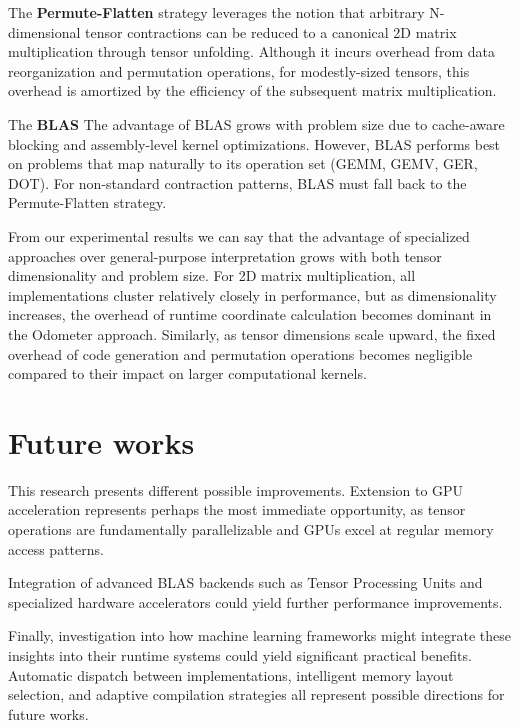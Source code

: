 \documentclass[binding=0.6cm]{sapthesis}
\begin{document}
The \textbf{Permute-Flatten} strategy leverages the notion that arbitrary N-dimensional tensor contractions can be reduced to a canonical 2D matrix multiplication through tensor unfolding. Although it incurs overhead from data reorganization and permutation operations, for modestly-sized tensors, this overhead is amortized by the efficiency of the subsequent matrix multiplication.

The \textbf{BLAS} The advantage of BLAS grows with problem size due to cache-aware blocking and assembly-level kernel optimizations. However, BLAS performs best on problems that map naturally to its operation set (GEMM, GEMV, GER, DOT). For non-standard contraction patterns, BLAS must fall back to the Permute-Flatten strategy.

From our experimental results we can say that the advantage of specialized approaches over general-purpose interpretation grows with both tensor dimensionality and problem size. For 2D matrix multiplication, all implementations cluster relatively closely in performance, but as dimensionality increases, the overhead of runtime coordinate calculation becomes dominant in the Odometer approach. Similarly, as tensor dimensions scale upward, the fixed overhead of code generation and permutation operations becomes negligible compared to their impact on larger computational kernels.

\section{Future works}

This research presents different possible improvements. Extension to GPU acceleration represents perhaps the most immediate opportunity, as tensor operations are fundamentally parallelizable and GPUs excel at regular memory access patterns.

Integration of advanced BLAS backends such as Tensor Processing Units and specialized hardware accelerators could yield further performance improvements.

Finally, investigation into how machine learning frameworks might integrate these insights into their runtime systems could yield significant practical benefits. Automatic dispatch between implementations, intelligent memory layout selection, and adaptive compilation strategies all represent possible directions for future works.



\end{document}
